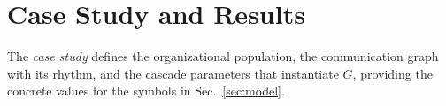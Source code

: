 \section{Case Study and Results}
\label{sec:results}

The \emph{case study} defines the organizational population, the communication graph with its rhythm, and the
cascade parameters that instantiate $G$, providing the concrete values for the symbols in
Sec.~\ref{sec:model}.

